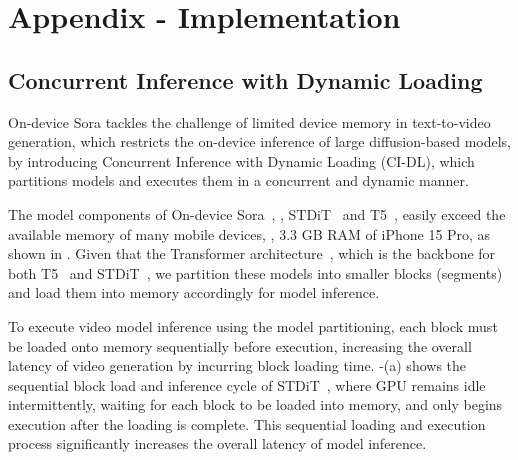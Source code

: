 \section{Appendix - Implementation}
\subsection{Concurrent Inference with Dynamic Loading}
\label{sec:ours3}


On-device Sora tackles the challenge of limited device memory in text-to-video generation, which restricts the on-device inference of large diffusion-based models, by introducing Concurrent Inference with Dynamic Loading (CI-DL), which partitions models and executes them in a concurrent and dynamic manner.

The model components of On-device Sora~\cite{liu2024sora}, \ie, STDiT~\cite{opensora} and T5~\cite{raffel2020exploring}, easily exceed the available memory of many mobile devices, \eg, 3.3 GB RAM of iPhone 15 Pro, as shown in . Given that the Transformer architecture~\cite{wolf2020transformers}, which is the backbone for both T5~\cite{raffel2020exploring} and STDiT~\cite{opensora}, we partition these models into smaller blocks (segments) and load them into memory accordingly for model inference.

To execute video model inference using the model partitioning, each block must be loaded onto memory sequentially before execution, increasing the overall latency of video generation by incurring block loading time. -(a) shows the sequential block load and inference cycle of STDiT~\cite{opensora}, where GPU remains idle intermittently, waiting for each block to be loaded into memory, and only begins execution after the loading is complete. This sequential loading and execution process significantly increases the overall latency of model inference.

